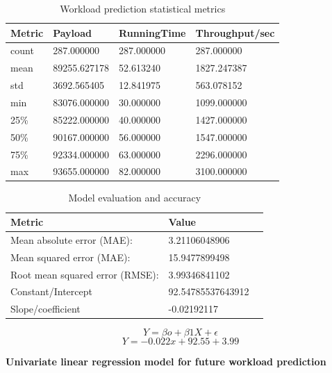 \documentclass[12pt, letterpaper, titlepage]{report}
\begin{document}
\begin{table}[h!]
	\centering
	\begin{tabular}{|l|l|l|l|}
		\hline
		\textbf{Metric} & \textbf{Payload} & \textbf{RunningTime} & \textbf{Throughput/sec} \\ \hline
		
				count  &  287.000000 &  287.000000 &     287.000000 \\ \hline
				mean &  89255.627178 &   52.613240  &   1827.247387 \\ \hline
				std &    3692.565405 &   12.841975 &     563.078152 \\ \hline
				min &   83076.000000 &   30.000000  &   1099.000000 \\ \hline
				25\%  &  85222.000000  &  40.000000 &    1427.000000 \\ \hline
				50\%  &  90167.000000 &   56.000000 &    1547.000000 \\ \hline
				75\%  &  92334.000000 &   63.000000  &   2296.000000 \\ \hline
				max  &  93655.000000  &  82.000000   &  3100.000000 \\ \hline

	\end{tabular}
	\caption{Workload prediction statistical metrics}
	\label{workloadPredDesc}
\end{table}


\begin{table}[h!]
	\centering
	\begin{tabular}{|l|l|l|}
		\hline
		\textbf{Metric} & \textbf{Value} \\ \hline
		Mean absolute error (MAE):  &  3.21106048906 \\ \hline
		Mean squared error (MAE):   &  15.9477899498 \\ \hline
		Root mean squared error (RMSE):   &  3.99346841102 \\ \hline
		Constant/Intercept  &  92.54785537643912 \\ \hline
		Slope/coefficient  &  -0.02192117\\ \hline
	\end{tabular}
	\caption{Model evaluation and accuracy}
	\label{regresModelEval100}
\end{table}
\pagebreak

$$ 
Y = \beta o + \beta1X + \epsilon 
$$
$$ 
Y = -0.022x + 92.55 + 3.99
$$

\begin{center}
 \textbf{Univariate linear regression model for future workload prediction}
\end{center}
\end{document}
